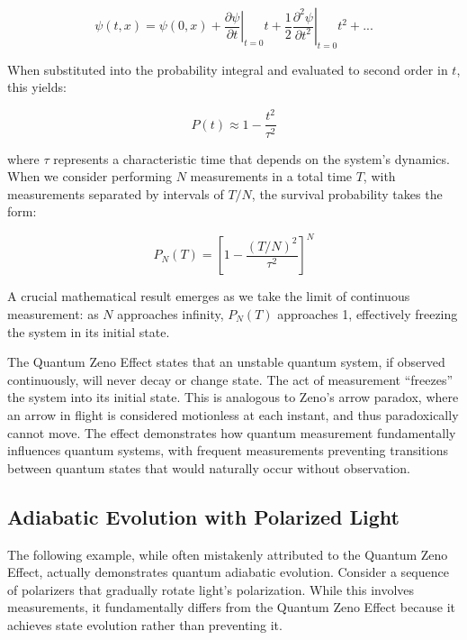 \documentclass[
  a4paper,
]{book}
\begin{document}
\[\psi(t,x) = \psi(0,x) + \left.\frac{\partial \psi}{\partial t}\right|_{t=0}t + \frac{1}{2}\left.\frac{\partial^2 \psi}{\partial t^2}\right|_{t=0}t^2 + ...\]

When substituted into the probability integral and evaluated to second
order in \(t\), this yields:

\[P(t) \approx 1 - \frac{t^2}{τ^2}\]

where \(τ\) represents a characteristic time that depends on the
system's dynamics. When we consider performing \(N\) measurements in a
total time \(T\), with measurements separated by intervals of \(T/N\),
the survival probability takes the form:

\[P_N(T) = \left[1 - \frac{(T/N)^2}{τ^2}\right]^N\]

A crucial mathematical result emerges as we take the limit of continuous
measurement: as \(N\) approaches infinity, \(P_N(T)\) approaches 1,
effectively freezing the system in its initial state.

\begin{tcolorbox}[enhanced jigsaw, coltitle=black, title=\textcolor{quarto-callout-note-color}{\faInfo}\hspace{0.5em}{The Quantum Zeno Effect}, colframe=quarto-callout-note-color-frame, toprule=.15mm, opacitybacktitle=0.6, left=2mm, opacityback=0, breakable, toptitle=1mm, bottomtitle=1mm, leftrule=.75mm, arc=.35mm, titlerule=0mm, colbacktitle=quarto-callout-note-color!10!white, rightrule=.15mm, bottomrule=.15mm, colback=white]

The Quantum Zeno Effect states that an unstable quantum system, if
observed continuously, will never decay or change state. The act of
measurement ``freezes'' the system into its initial state. This is
analogous to Zeno's arrow paradox, where an arrow in flight is
considered motionless at each instant, and thus paradoxically cannot
move. The effect demonstrates how quantum measurement fundamentally
influences quantum systems, with frequent measurements preventing
transitions between quantum states that would naturally occur without
observation.

\end{tcolorbox}

\subsection{Adiabatic Evolution with Polarized
Light}\label{adiabatic-evolution-with-polarized-light}

The following example, while often mistakenly attributed to the Quantum
Zeno Effect, actually demonstrates quantum adiabatic evolution. Consider
a sequence of polarizers that gradually rotate light's polarization.
While this involves measurements, it fundamentally differs from the
Quantum Zeno Effect because it achieves state evolution rather than
preventing it.
\end{document}
